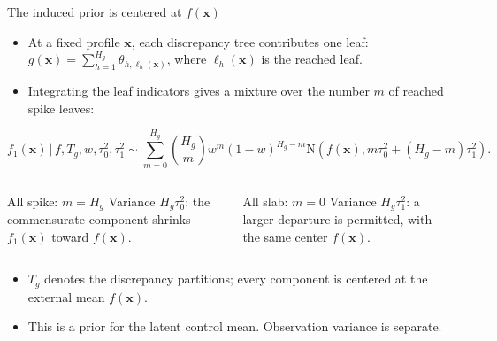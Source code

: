\documentclass[11pt,aspectratio=169]{beamer}
\newcommand{\Normal}{\mathrm{N}}
\newcommand{\bx}{\bm{x}}
\newcommand{\given}{\,\vert\,}
\begin{document}
\begin{frame}{The induced prior is centered at $f(\bx)$}
  \small
  \begin{itemize}
    \item At a fixed profile $\bx$, each discrepancy tree contributes one leaf:
      $g(\bx)=\sum_{h=1}^{H_g}\theta_{h,\ell_h(\bx)}$, where $\ell_h(\bx)$ is the reached leaf.
    \item Integrating the leaf indicators gives a mixture over the number $m$ of reached spike leaves:
  \end{itemize}
  \[
  f_1(\bx)\given f,T_g,w,\tau_0^2,\tau_1^2
  \sim\sum_{m=0}^{H_g}\binom{H_g}{m}w^m(1-w)^{H_g-m}
  \Normal\!\left(f(\bx),m\tau_0^2+(H_g-m)\tau_1^2\right).
  \]
  \begin{columns}[T,onlytextwidth]
      \begin{block}{All spike: $m=H_g$}
        Variance $H_g\tau_0^2$: the commensurate component shrinks $f_1(\bx)$ toward $f(\bx)$.
      \end{block}
      \begin{block}{All slab: $m=0$}
        Variance $H_g\tau_1^2$: a larger departure is permitted, with the same center $f(\bx)$.
      \end{block}
  \end{columns}
  \vspace{0.3em}
  \begin{itemize}\footnotesize
    \item $T_g$ denotes the discrepancy partitions; every component is centered at the external mean $f(\bx)$.
    \item This is a prior for the latent control mean. Observation variance is separate.
  \end{itemize}
\end{frame}


\end{document}
